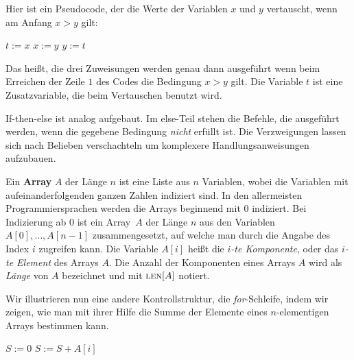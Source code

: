 \begin{bsp} 
Hier ist ein Pseudocode, der die Werte der Variablen $x$ und $y$ vertauscht, wenn am Anfang $x>y$ gilt: 
\begin{center}
	\begin{algorithmic}[1]
		\STATE $t:=x$
		\STATE $x:=y$
		\STATE $y:=t$
		\ENDIF
	\end{algorithmic}
\end{center}
Das heißt, die drei Zuweisungen werden genau dann ausgeführt wenn beim Erreichen der Zeile $1$ des Codes die Bedingung $x>y$ gilt. Die Variable $t$ ist eine Zusatzvariable, die beim Vertauschen benutzt wird. 

If-then-else ist analog aufgebaut. Im else-Teil stehen die Befehle, die ausgeführt werden, wenn die gegebene Bedingung \emph{nicht} erfüllt ist. 
Die Verzweigungen lassen sich nach Belieben verschachteln um komplexere Handlungsanweisungen aufzubauen.
\end{bsp} 

\begin{defn} 
Ein \textbf{Array} $A$ der Länge $n$ ist eine Liste aus $n$ Variablen, wobei die Variablen mit aufeinanderfolgenden ganzen Zahlen indiziert sind. In den allermeisten Programmiersprachen werden die Arrays beginnend mit $0$ indiziert. Bei Indizierung ab $0$ ist ein Array~$A$ der Länge $n$ aus den Variablen $A[0],\ldots,A[n-1]$ zusammengesetzt, auf welche man durch die Angabe des Index $i$ zugreifen kann. Die Variable $A[i]$ heißt die \emph{$i$-te Komponente}, oder das \emph{$i$-te Element} des Arrays $A$. Die Anzahl der Komponenten eines Arrays $A$ wird als \emph{Länge} von $A$ bezeichnet und mit $\mathop{\text{\textsc{len}}}[A]$ notiert.
\end{defn} 

\begin{bsp} 
Wir illustrieren nun eine andere Kontrollstruktur, die \emph{for}-Schleife, indem wir zeigen, wie man mit ihrer Hilfe die Summe der Elemente eines $n$-elementigen Arrays bestimmen kann. 

\begin{center}
	\begin{algorithmic}[1]
		\STATE $S:=0$
		\STATE $S:=S+A[i]$
		\ENDFOR
	\end{algorithmic}
\end{center}
\end{bsp} 


